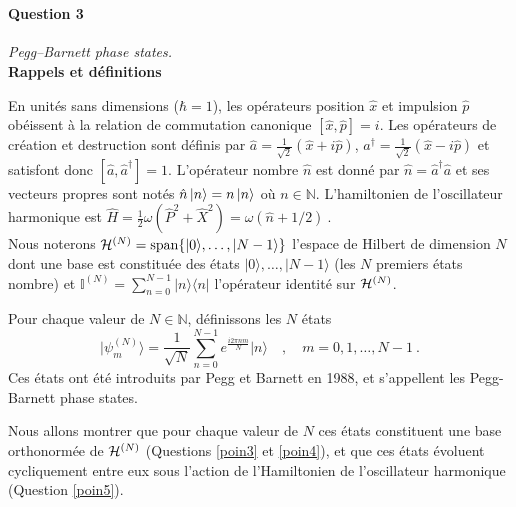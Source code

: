 \newpage
\ 

\newpage


\paragraph{Question 3} \textit{Pegg--Barnett phase states.} \\




{\bf Rappels et définitions}

 En unités sans dimensions ($\hbar=1$), les opérateurs position $\hat x$ et impulsion $\hat p$ obéissent à la relation de commutation canonique $[\hat x, \hat p]=i $.  Les opérateurs de création et destruction sont définis par 
$\hat a= \frac{1}{\sqrt{2}}(\hat x+i\hat p)$, $a^\dagger= \frac{1}{\sqrt{2}}(\hat x-i\hat p)$ et satisfont donc $[\hat a,\hat a^\dagger]=1$. L'opérateur nombre $\hat n$ est donné par $\hat n= \hat a^\dagger \hat a$ et ses vecteurs propres sont notés $\hat n \ket{n} =n \ket{n}$ où $n \in \mathbb{N}$. 
L'hamiltonien de l'oscillateur harmonique est $\hat H = \frac{1}{2}\omega ( \hat P^2 + \hat X^2 ) = \omega (\hat n + 1/2)\ $. \\



Nous noterons ${\cal H}^{(N)}={\text{span}}\{\lvert 0\rangle, \dotsc, \lvert N-1\rangle\}$ l'espace de Hilbert de dimension $N$ dont une base est constituée des états 
$\lvert 0\rangle, \dotsc, \lvert N-1\rangle$ (les $N$ premiers états nombre)
et $\mathbb{I}^{(N)} =\sum_{n=0}^{N-1} \lvert n \rangle \langle n \rvert$ l'opérateur identité sur ${\cal H}^{(N)}$.


Pour chaque valeur de $N\in \mathbb{N}$, définissons les $N$ états
\begin{equation}
\lvert \psi^{(N)}_m\rangle = \frac{1}{\sqrt{N}} \sum_{n=0}^{N-1} e^{\frac{i 2 \pi  nm}{N}} \lvert n \rangle\quad , \quad m=0,1,\dotsc,N-1\ .
\label{eq:states}
\end{equation}
Ces états ont été introduits par Pegg et Barnett en 1988, et s'appellent les Pegg-Barnett phase states.

Nous allons montrer que pour chaque valeur de $N$ ces états constituent une base orthonormée de ${\cal H}^{(N)}$ (Questions \ref{poin3} et \ref{poin4}), et que ces états évoluent cycliquement entre eux sous l'action de l'Hamiltonien de l'oscillateur harmonique (Question \ref{poin5}).


